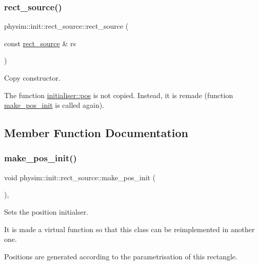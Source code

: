 \subsubsection{\texorpdfstring{rect\+\_\+source()}{rect\_source()}}
{\footnotesize\ttfamily physim\+::init\+::rect\+\_\+source\+::rect\+\_\+source (\begin{DoxyParamCaption}\item[{const \hyperlink{classphysim_1_1init_1_1rect__source}{rect\+\_\+source} \&}]{rs }\end{DoxyParamCaption})}



Copy constructor. 

The function \hyperlink{classphysim_1_1init_1_1initialiser_a1980105ffaa655858b90a8f3a9368682}{initialiser\+::pos} is not copied. Instead, it is remade (function \hyperlink{classphysim_1_1init_1_1rect__source_a3789669ec12884fe9fe766cefb02a5ed}{make\+\_\+pos\+\_\+init} is called again). 

\subsection{Member Function Documentation}
\mbox{\label{classphysim_1_1init_1_1rect__source_a3789669ec12884fe9fe766cefb02a5ed}} 
\subsubsection{\texorpdfstring{make\+\_\+pos\+\_\+init()}{make\_pos\_init()}}
{\footnotesize\ttfamily void physim\+::init\+::rect\+\_\+source\+::make\+\_\+pos\+\_\+init (\begin{DoxyParamCaption}{ }\end{DoxyParamCaption})\hspace{0.3cm}{\ttfamily [protected]}, {\ttfamily [virtual]}}



Sets the position initialser. 

It is made a virtual function so that this class can be reimplemented in another one.

Positions are generated according to the parametrisation of this rectangle. \mbox{\label{classphysim_1_1init_1_1rect__source_a3b825bcedd2d622dabc10aa6a1252cbf}} 
